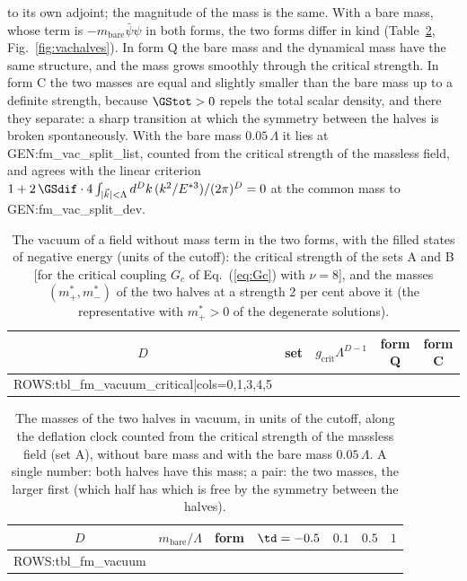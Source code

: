 to its own adjoint; the magnitude of the mass is the same. With a bare mass, whose term is
$-m_{\mathrm{bare}}\bar\psi\psi$ in both forms, the two forms differ in kind
(Table~\ref{tab:vacclock}, Fig.~\ref{fig:vachalves}). In form Q the bare mass and the dynamical
mass have the same structure, and the mass grows smoothly through the critical strength. In form C
the two masses are equal and slightly smaller than the bare mass up to a definite strength, because
$\GStot>0$ repels the total scalar density, and there they separate: a sharp transition at which the
symmetry between the halves is broken spontaneously. With the bare mass $0.05\,\Lambda$ it lies at
{{GEN:fm_vac_split_list}}, counted from the critical strength of the massless field, and agrees with
the linear criterion $1+2\,\GSdif\cdot4\int_{|\vec k|<\Lambda}d^{D}k\,(k^{2}/E^{*3})/(2\pi)^{D}=0$ at
the common mass to {{GEN:fm_vac_split_dev}}.

\begin{table}
\caption{\label{tab:vachalves}The vacuum of a field without mass term in the two forms, with the
filled states of negative energy (units of the cutoff): the critical strength of the sets A and B
[for the critical coupling $G_c$ of Eq.~(\ref{eq:Gc}) with $\nu=8$], and the masses
$(m^{*}_+,m^{*}_-)$ of the two halves at a strength 2 per cent above it (the representative with
$m^{*}_+>0$ of the degenerate solutions).}
\begin{ruledtabular}
\begin{tabular}{ccccc}
$D$ & set & $g_{\mathrm{crit}}\Lambda^{D-1}$ & form Q & form C \\
\hline
{{ROWS:tbl_fm_vacuum_critical|cols=0,1,3,4,5}}
\end{tabular}
\end{ruledtabular}
\end{table}

\begin{table}
\caption{\label{tab:vacclock}The masses of the two halves in vacuum, in units of the cutoff,
along the deflation clock counted from the critical strength of the massless field (set A), without
bare mass and with the bare mass $0.05\,\Lambda$. A single number: both halves have this mass; a
pair: the two masses, the larger first (which half has which is free by the symmetry between the
halves).}
\begin{ruledtabular}
\begin{tabular}{ccccccc}
$D$ & $m_{\mathrm{bare}}/\Lambda$ & form & $\td=-0.5$ & $0.1$ & $0.5$ & $1$ \\
\hline
{{ROWS:tbl_fm_vacuum}}
\end{tabular}
\end{ruledtabular}
\end{table}


